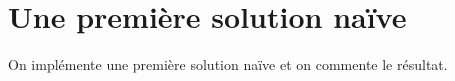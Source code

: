 \section{Une première solution naïve}

On implémente une première solution naïve et on commente le résultat.
